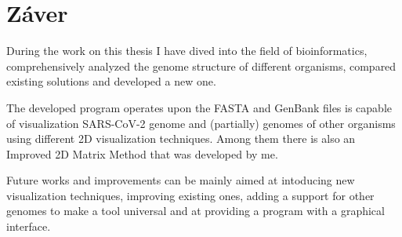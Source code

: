 
\chapter{Záver}
\label{summary}

During the work on this thesis I have dived into the field of bioinformatics, comprehensively analyzed the genome structure of different organisms, compared existing solutions and developed a new one.

The developed program operates upon the FASTA and GenBank files is capable of visualization SARS-CoV-2 genome and (partially) genomes of other organisms using different 2D visualization techniques.
Among them there is also an Improved 2D Matrix Method that was developed by me.

Future works and improvements can be mainly aimed at intoducing new visualization techniques, improving existing ones, adding a support for other genomes to make a tool universal and at providing a program with a graphical interface.